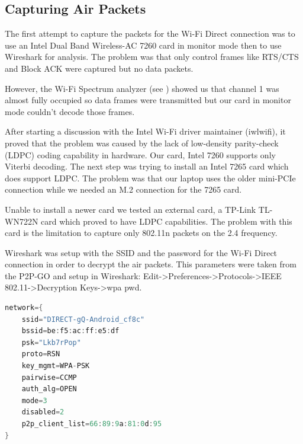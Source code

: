 \subsection{Capturing Air Packets}
\label{sub-sec:proj-scopemonitormode}

The first attempt to capture the packets for the Wi-Fi Direct connection was to use an Intel Dual Band Wireless-AC 7260 card \cite{cite-intel7260} in monitor mode then to use Wireshark \cite{cite-wireshark}  for analysis. The problem was that only control frames like RTS/CTS and Block ACK were captured but no data packets.

However, the Wi-Fi Spectrum analyzer (see ) showed us that channel 1 was almost fully occupied so data frames were transmitted but our card in monitor mode couldn't decode those frames.


After starting a discussion \cite{cite-monitordiscussion} with the Intel Wi-Fi driver maintainer (iwlwifi), it proved that the problem was caused by the lack of low-density parity-check (LDPC) coding capability in hardware. Our card, Intel 7260 supports only Viterbi decoding. The next step was trying to install an Intel 7265 card which does support LDPC. The problem was that our laptop uses the older mini-PCIe connection while we needed an M.2 connection for the 7265 card.

Unable to install a newer card we tested an external card, a TP-Link TL-WN722N card \cite{cite-tplink} which proved to have LDPC capabilities. The problem with this card is the limitation to capture only 802.11n packets on the 2.4 frequency.

Wireshark was setup with the SSID and the password for the Wi-Fi Direct connection in order to decrypt the air packets. This parameters were taken from the P2P-GO and setup in Wireshark: Edit->Preferences->Protocols->IEEE 802.11->Decryption Keys->wpa pwd.

\begin{lstlisting}[language=C, frame=single, caption={Listing from /data/misc/wifi/p2p_supplicant.conf on the P2P GO},label=p2p_supplicant]
network={
	ssid="DIRECT-gQ-Android_cf8c"
	bssid=be:f5:ac:ff:e5:df
	psk="Lkb7rPop"
	proto=RSN
	key_mgmt=WPA-PSK
	pairwise=CCMP
	auth_alg=OPEN
	mode=3
	disabled=2
	p2p_client_list=66:89:9a:81:0d:95
}
\end{lstlisting}


